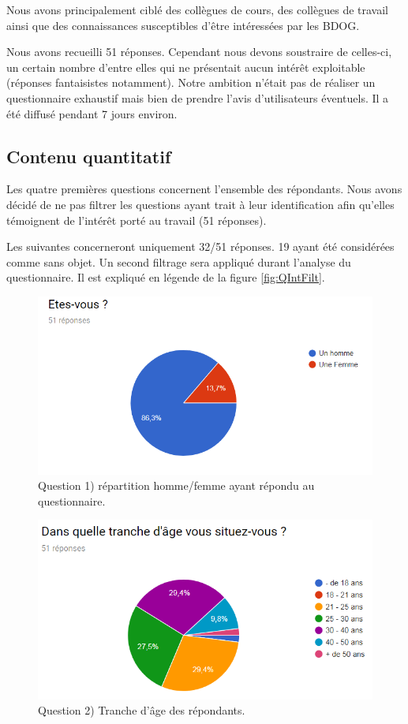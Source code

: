 \documentclass[a4paper,fleqn,12pt,oneside]{book}
\begin{document}
Nous avons principalement ciblé des collègues de cours, des collègues de travail ainsi que des connaissances susceptibles d'être intéressées par les BDOG.

Nous avons recueilli 51 réponses. Cependant nous devons soustraire de celles-ci, un certain nombre d'entre elles qui ne présentait aucun intérêt exploitable (réponses fantaisistes notamment). Notre ambition n'était pas de réaliser un questionnaire exhaustif mais bien de prendre l'avis d'utilisateurs éventuels. Il a été diffusé pendant 7 jours environ.


\subsection{Contenu quantitatif}

Les quatre premières questions concernent l'ensemble des répondants. Nous avons décidé de ne pas filtrer les questions ayant trait à leur identification afin qu'elles témoignent de l'intérêt porté au travail (51 réponses).

Les suivantes concerneront uniquement 32/51 réponses. 19 ayant été considérées comme sans objet. Un second filtrage sera appliqué durant l'analyse du questionnaire. Il est expliqué en légende de la figure \ref{fig:QIntFilt}.
\newpage
{}

\begin{figure}[!ht]
\centering
\includegraphics[scale=1]{figures/QHF.png}
\caption{Question 1) répartition homme/femme ayant répondu au questionnaire.}
\label{fig:QHF}
\end{figure}

\begin{figure}[!ht]
\centering
\includegraphics[scale=1]{figures/QAge.png}
\caption{Question 2) Tranche d'âge des répondants.}
\label{fig:QAge}
\end{figure}
\end{document}
